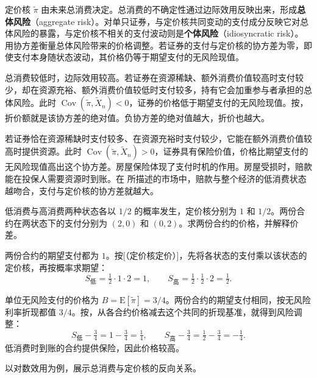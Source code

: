 定价核 $\widetilde\pi$ 由未来总消费决定。总消费的不确定性通过边际效用反映出来，形成\textbf{总体风险}（aggregate risk）。对单只证券，与定价核共同变动的支付成分反映它对总体风险的暴露，与定价核不相关的支付波动则是\textbf{个体风险}（idiosyncratic risk）。 用协方差衡量总体风险带来的价格调整。若证券的支付与定价核的协方差为零，即使支付本身随状态波动，其价格仍等于期望支付的无风险现值。

总消费较低时，边际效用较高。若证券在资源稀缺、额外消费价值较高时支付较少，却在资源充裕、额外消费价值较低时支付较多，持有它会加重参与者承担的总体风险。此时 $\operatorname{Cov}(\widetilde\pi,\widetilde X_n)<0$，证券的价格低于期望支付的无风险现值。按，折价额就是该协方差的绝对值。负协方差的绝对值越大，折价也越大。

若证券恰在资源稀缺时支付较多、在资源充裕时支付较少，它能在额外消费价值较高时提供资源。此时 $\operatorname{Cov}(\widetilde\pi,\widetilde X_n)>0$，证券具有保险价值，价格比期望支付的无风险现值高出这个协方差。房屋保险体现了支付时机的作用。房屋受损时，赔款能在投保人需要资源时到账。在 所描述的市场中，赔款与整个经济的低消费状态越吻合，支付与定价核的协方差就越大。

\begin{tcolorbox}[example,title=补充算例：同样的期望支付为何价格不同]
\begin{question}
低消费与高消费两种状态各以 $1/2$ 的概率发生，定价核分别为 $1$ 和 $1/2$。两份合约在两状态下的支付分别为 $(2,0)$ 和 $(0,2)$。求两份合约的价格，并解释价差。
\end{question}
\begin{solution}[blank-type=manual]
两份合约的期望支付都为 $1$。按[（定价核定价）]，先将各状态的支付乘以该状态的定价核，再按概率求期望：
\[
 S_{\text{低}}=\tfrac12\cdot1\cdot2=1,\qquad
 S_{\text{高}}=\tfrac12\cdot\tfrac12\cdot2=\tfrac12.
\]

单位无风险支付的价格为 $B=\mathrm E[\widetilde\pi]=3/4$。两份合约的期望支付相同，按无风险利率折现都值 $3/4$。按，从各合约价格减去这个共同的折现基准，就得到风险调整：
\[
 S_{\text{低}}-\tfrac34=1-\tfrac34=\tfrac14,\qquad
 S_{\text{高}}-\tfrac34=\tfrac12-\tfrac34=-\tfrac14.
\]
低消费时到账的合约提供保险，因此价格较高。
\end{solution}
\end{tcolorbox}

 以对数效用为例，展示总消费与定价核的反向关系。

